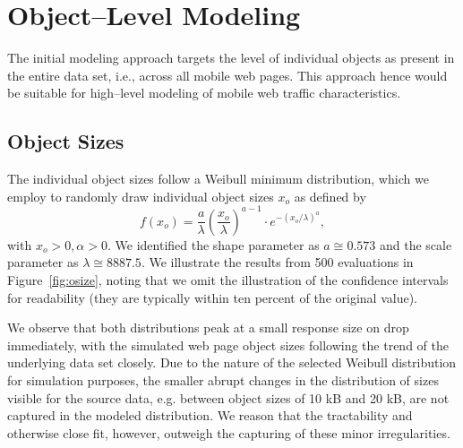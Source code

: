 \section{Object--Level Modeling}
\label{s:object}
The initial modeling approach targets the level of individual objects as present in the entire data set, i.e., across all mobile web pages. 
This approach hence would be suitable for high--level modeling of mobile web traffic characteristics.

\subsection{Object Sizes}
The individual object sizes follow a Weibull minimum distribution, which we employ to randomly draw individual object sizes $x_o$ as defined by 
\begin{equation}\label{eq:weibull}
f\left(x_o\right) = \frac{a}{\lambda} \left(\frac{x_o}{\lambda}\right)^{a-1} \cdot e^{-(x_o/\lambda)^a}, 
\end{equation}
with $x_o>0, \alpha>0$.
We identified the shape parameter as $a \cong  0.573$ and the scale parameter as $\lambda \cong 8887.5$.
We illustrate the results from 500 evaluations in Figure~\ref{fig:osize}, noting that we omit the illustration of the confidence intervals for readability (they are typically within ten percent of the original value).

We observe that both distributions peak at a small response size on drop immediately, with the simulated web page object sizes following the trend of the underlying data set closely.
Due to the nature of the selected Weibull distribution for simulation purposes, the smaller abrupt changes in the distribution of sizes visible for the source data, e.g. between object sizes of 10 kB and 20 kB, are not captured in the modeled distribution.
We reason that the tractability and otherwise close fit, however, outweigh the capturing of these minor irregularities.


